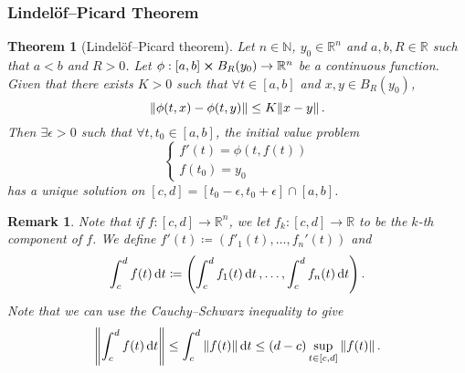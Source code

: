 \documentclass{article}
\theoremstyle{plain}\theoremheaderfont{\normalfont\itshape}\theorembodyfont{\rmfamily}\theoremseparator{.}\newtheorem*{rem}{Remark}\newtheorem*{ex}{Example}\newtheorem*{proof}{Proof}\newtheorem*{altp}{Alternative proof}
\theoremstyle{plain}\theoremheaderfont{\normalfont\bfseries}\theorembodyfont{\rmfamily}\theoremseparator{.}\newtheorem{thm}{Theorem}[section]\newtheorem{lem}[thm]{Lemma}\newtheorem{prop}[thm]{Proposition}\newtheorem*{cor}{Corollary}\newtheorem{defn}[thm]{Definition}\newtheorem{clm}[thm]{Claim}\newtheorem{clminproof}{Claim}
\theoremstyle{break}\theoremheaderfont{\normalfont\itshape}\theorembodyfont{\rmfamily}\theoremseparator{.\medskip}\newtheorem*{proofskip}{Proof}\newtheorem*{exs}{Examples}\newtheorem*{rems}{Remarks}
\theoremstyle{break}\theoremheaderfont{\normalfont\bfseries}\theorembodyfont{\rmfamily}\theoremseparator{.\medskip}\newtheorem{lemskip}[thm]{Lemma}\newtheorem{defnskip}[thm]{Definition}\newtheorem{propskip}[thm]{Proposition}\newtheorem{thmskip}[thm]{Theorem}
\begin{document}
    \subsubsection{Lindel\"{o}f--Picard Theorem}
    \begin{thm}[Lindel\"{o}f--Picard theorem]
        Let \(n\in\mathbb{N}\), \(y_0\in\mathbb{R}^n\) and \(a,b,R\in\mathbb{R}\) such that \(a<b\) and \(R>0\). Let \(\phi:[a,b]\cross B_R(y_0)\to\mathbb{R}^n\) be a continuous function. Given that there exists \(K>0\) such that \(\forall t\in[a,b]\) and \(x,y\in B_R(y_0)\),
        \[\norm{\phi(t,x)-\phi(t,y)}\le K\norm{x-y}\,.\]
        Then \(\exists\epsilon>0\) such that \(\forall t,t_0\in[a,b]\), the initial value problem
        \[\begin{cases}
            f'(t)=\phi(t,f(t))\\
            f(t_0)=y_0
        \end{cases}\]
        has a unique solution on \([c,d]=[t_0-\epsilon,t_0+\epsilon]\cap[a,b]\).
    \end{thm}
    \begin{rem}
        Note that if \(f:[c,d]\to\mathbb{R}^n\), we let \(f_k:[c,d]\to\mathbb{R}\) to be the \(k\)-th component of \(f\). We define \(f'(t)\coloneqq(f'_1(t),\dots,f_n'(t))\) and
        \[\int_{c}^{d}f(t)\dd{t}\coloneqq\qty(\int_{c}^{d}f_1(t)\dd{t},\dots,\int_{c}^{d}f_n(t)\dd{t})\,.\]
        Note that we can use the Cauchy--Schwarz inequality to give
        \[\norm{\int_{c}^{d}f(t)\dd{t}}\le\int_{c}^{d}\norm{f(t)}\dd{t}\le(d-c)\sup_{t\in[c,d]}\norm{f(t)}\,.\]
    \end{rem}
\end{document}
